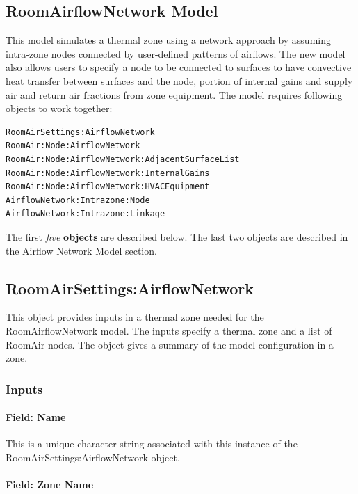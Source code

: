 \subsection{RoomAirflowNetwork Model}\label{roomairflownetwork-model}

This model simulates a thermal zone using a network approach by assuming intra-zone nodes connected by user-defined patterns of airflows. The new model also allows users to specify a node to be connected to surfaces to have convective heat transfer between surfaces and the node, portion of internal gains and supply air and return air fractions from zone equipment. The model requires following objects to work together:

\begin{lstlisting}
RoomAirSettings:AirflowNetwork
RoomAir:Node:AirflowNetwork
RoomAir:Node:AirflowNetwork:AdjacentSurfaceList
RoomAir:Node:AirflowNetwork:InternalGains
RoomAir:Node:AirflowNetwork:HVACEquipment
AirflowNetwork:Intrazone:Node
AirflowNetwork:Intrazone:Linkage
\end{lstlisting}

The first \emph{five} \textbf{objects} are described below. The last two objects are described in the Airflow Network Model section.

\subsection{RoomAirSettings:AirflowNetwork}\label{roomairsettingsairflownetwork}

This object provides inputs in a thermal zone needed for the RoomAirflowNetwork model. The inputs specify a thermal zone and a list of RoomAir nodes. The object gives a summary of the model configuration in a zone.

\subsubsection{Inputs}\label{inputs-12-015}

\paragraph{Field: Name}\label{field-name-7-017}

This is a unique character string associated with this instance of the RoomAirSettings:AirflowNetwork object.

\paragraph{Field: Zone Name}\label{field-zone-name-8-002}


